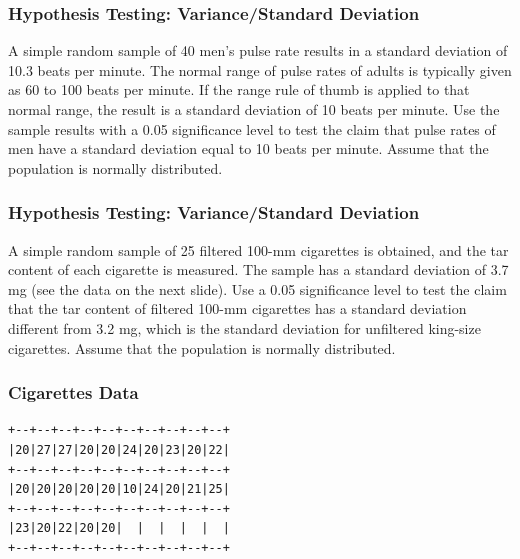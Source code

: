 \documentclass[xcolor=dvipsnames]{beamer}
\begin{document}
\begin{frame}
  \frametitle{Hypothesis Testing:
    Variance/Standard Deviation}
  {\ubung} A simple random sample of 40 men's pulse rate results
  in a standard deviation of 10.3 beats per minute. The normal
  range of pulse rates of adults is typically given as 60 to 100
  beats per minute. If the range rule of thumb is applied to that
  normal range, the result is a standard deviation of 10 beats per
  minute. Use the sample results with a 0.05 significance level to
  test the claim that pulse rates of men have a standard deviation
  equal to 10 beats per minute. Assume that the population is
  normally distributed.
\end{frame}


\begin{frame}
  \frametitle{Hypothesis Testing: Variance/Standard Deviation}
  {\ubung} A simple random sample of 25 filtered 100-mm cigarettes
  is obtained, and the tar content of each cigarette is measured.
  The sample has a standard deviation of 3.7 mg (see the data on
  the next slide). Use a 0.05 significance level to test the claim
  that the tar content of filtered 100-mm cigarettes has a
  standard deviation different from 3.2 mg, which is the standard
  deviation for unfiltered king-size cigarettes. Assume that the
  population is normally distributed.
\end{frame}

\begin{frame}[fragile]
  \frametitle{Cigarettes Data}
\begin{verbatim}
+--+--+--+--+--+--+--+--+--+--+
|20|27|27|20|20|24|20|23|20|22|
+--+--+--+--+--+--+--+--+--+--+
|20|20|20|20|20|10|24|20|21|25|
+--+--+--+--+--+--+--+--+--+--+
|23|20|22|20|20|  |  |  |  |  |
+--+--+--+--+--+--+--+--+--+--+
\end{verbatim}
\end{frame}

\end{document}

